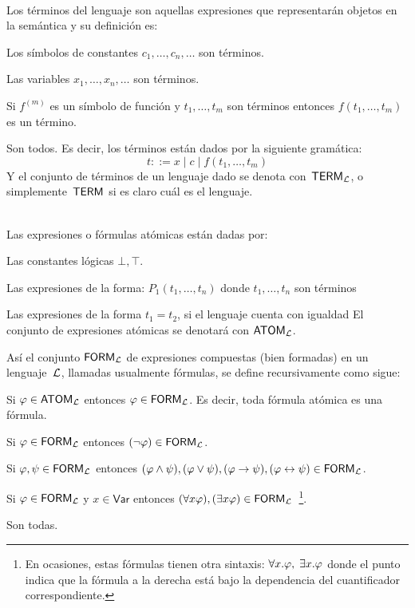 \documentclass[11pt,letterpaper]{article}
\begin{document}
\begin{description}
 \item[Términos] \hfill\\
Los términos del lenguaje son aquellas expresiones que representarán
objetos en la semántica y su definición es:
\bi
 \item Los símbolos de constantes $c_1,\ldots,c_n,\ldots$ son términos.
 \item Las variables $x_1,\ldots,x_n,\ldots$ son términos. 
 \item Si $f^{(m)}$ es un símbolo de función y $t_1,\ldots,t_m$ son términos 
  entonces $f(t_1,\ldots,t_m)$ es un término.
 \item Son todos.
\ei
Es decir, los términos están dados por la siguiente gramática:
$$ t ::= x \mid c \mid f(t_1,\ldots,t_m) $$
Y el conjunto de términos de un lenguaje dado se denota con~$\mathsf{TERM}_{\mathcal{L}}$, o
simplemente~$\mathsf{TERM}$ si es claro cuál es el lenguaje. 

\smallskip

\item[Fórmulas]\hfill\\
Las expresiones o fórmulas atómicas est\'an dadas por:
\bi
\item Las constantes lógicas $\bot,\top$.
\item Las expresiones de la forma: $P_1(t_1,\ldots,t_n)$ donde
  $t_1,\ldots,t_n$ son términos 
\item Las expresiones de la forma $t_1=t_2$, si el lenguaje cuenta con igualdad
\ei
El conjunto de expresiones atómicas se denotará con $\mathsf{ATOM}_{\mathcal{L}}$.

\noindent As\'i el conjunto $\mathsf{FORM}_{\mathcal{L}}$ de expresiones compuestas (bien formadas) 
en un lenguaje~$\mathcal{L}$, llamadas usualmente fórmulas, se define recursivamente como sigue: 
\bi
\item Si $\varphi\in\mathsf{ATOM}_{\mathcal{L}}$ entonces $\varphi\in\mathsf{FORM}_{\mathcal{L}}$. Es decir, 
toda fórmula atómica es una fórmula.
\item Si $\varphi\in\mathsf{FORM}_{\mathcal{L}}$ entonces $(\neg\varphi)\in\mathsf{FORM}_{\mathcal{L}}$.
\item Si $\varphi,\psi\in\mathsf{FORM}_{\mathcal{L}}$ entonces 
$(\varphi\land\psi),(\varphi\lor\psi),(\varphi\rightarrow\psi),(\varphi\leftrightarrow\psi)\in\mathsf{FORM}_{\mathcal{L}}$.
\item Si $\varphi\in\mathsf{FORM}_{\mathcal{L}}$ y $x\in\mathsf{Var}$ entonces 
$(\forall x\varphi),(\exists x\varphi)\in\mathsf{FORM}_{\mathcal{L}}$~\footnote{En ocasiones, estas f\'ormulas 
tienen otra sintaxis: $\forall x.\varphi,\; \exists x.\varphi$ donde el punto indica que 
la f\'ormula a la derecha est\'a bajo la dependencia del cuantificador correspondiente.}.
\item Son todas.
\ei
\end{description}
\end{document}
